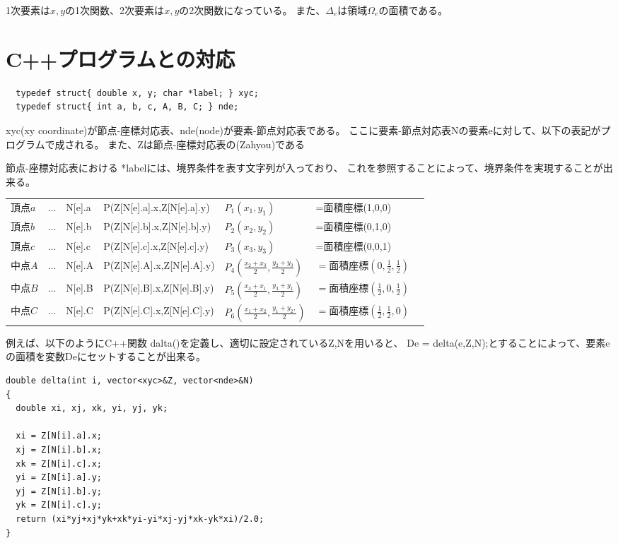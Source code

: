 \documentclass{jarticle}
\begin{document}
1次要素は$x,y$の1次関数、2次要素は$x,y$の2次関数になっている。
また、$\Delta_e$は領域$\Omega_e$の面積である。

\section{C++プログラムとの対応}

\begin{verbatim}
  typedef struct{ double x, y; char *label; } xyc;
  typedef struct{ int a, b, c, A, B, C; } nde;
\end{verbatim}

xyc(xy coordinate)が節点-座標対応表、nde(node)が要素-節点対応表である。
ここに要素-節点対応表Nの要素eに対して、以下の表記がプログラムで成される。
また、Zは節点-座標対応表の(Zahyou)である

節点-座標対応表における *labelには、境界条件を表す文字列が入っており、
これを参照することによって、境界条件を実現することが出来る。

\begin{center}
\begin{tabular}{lllllll}
  $頂点a$&...&N[e].a&P(Z[N[e].a].x,Z[N[e].a].y)&$P_1(x_1,y_1)$&=面積座標(1,0,0)\\
  $頂点b$&...&N[e].b&P(Z[N[e].b].x,Z[N[e].b].y)&$P_2(x_2,y_2)$&=面積座標(0,1,0)\\
  $頂点c$&...&N[e].c&P(Z[N[e].c].x,Z[N[e].c].y)&$P_3(x_3,y_3)$&=面積座標(0,0,1)\\
  $中点A$&...&N[e].A&P(Z[N[e].A].x,Z[N[e].A].y)&$P_4(\frac{x_2+x_3}{2},\frac{y_2+y_3}{2})$&$=面積座標(0,\frac{1}{2},\frac{1}{2})$\\
  $中点B$&...&N[e].B&P(Z[N[e].B].x,Z[N[e].B].y)&$P_5(\frac{x_3+x_1}{2},\frac{y_3+y_1}{2})$&$=面積座標(\frac{1}{2},0,\frac{1}{2})$\\
  $中点C$&...&N[e].C&P(Z[N[e].C].x,Z[N[e].C].y)&$P_6(\frac{x_1+x_2}{2},\frac{y_1+y_2,}{2})$&$=面積座標(\frac{1}{2},\frac{1}{2},0)$
\end{tabular}
\end{center}


例えば、以下のようにC++関数 dalta()を定義し、適切に設定されているZ,Nを用いると、
De = delta(e,Z,N);とすることによって、要素eの面積を変数Deにセットすることが出来る。


\begin{verbatim}
double delta(int i, vector<xyc>&Z, vector<nde>&N)
{
  double xi, xj, xk, yi, yj, yk;

  xi = Z[N[i].a].x;
  xj = Z[N[i].b].x;
  xk = Z[N[i].c].x;
  yi = Z[N[i].a].y;
  yj = Z[N[i].b].y;
  yk = Z[N[i].c].y;
  return (xi*yj+xj*yk+xk*yi-yi*xj-yj*xk-yk*xi)/2.0;
}
\end{verbatim}
\end{document}
